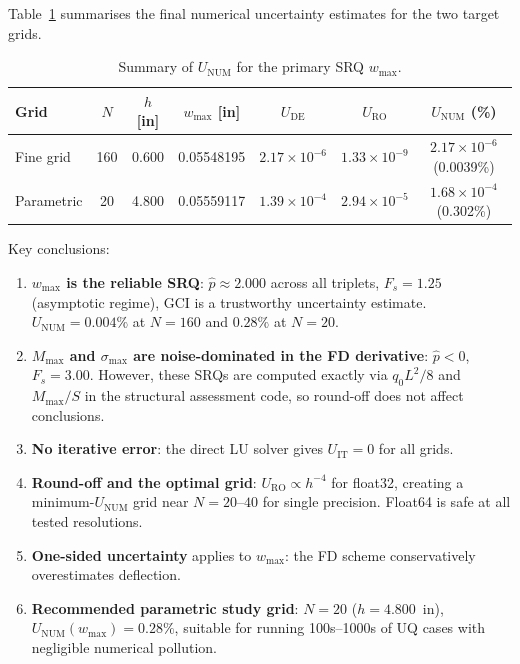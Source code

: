 \documentclass[11pt,letterpaper]{article}
\newcommand{\UDE}{U_{\mathrm{DE}}}
\newcommand{\UIT}{U_{\mathrm{IT}}}
\newcommand{\URO}{U_{\mathrm{RO}}}
\newcommand{\UNUM}{U_{\mathrm{NUM}}}
\newcommand{\pobs}{\hat{p}}
\begin{document}
Table~\ref{tab:summary} summarises the final numerical uncertainty estimates
for the two target grids.

\begin{table}[h!]
\centering
\caption{Summary of $\UNUM$ for the primary SRQ $w_{\max}$.}
\label{tab:summary}
\begin{tabular}{lcccccc}
  \toprule
  Grid & $N$ & $h$ [in] & $w_{\max}$ [in] & $\UDE$ & $\URO$ & $\UNUM$ (\%) \\
  \midrule
  Fine grid      & 160 & 0.600 & 0.05548195 & $2.17\times10^{-6}$ & $1.33\times10^{-9}$ & $2.17\times10^{-6}$ (0.0039\%) \\
  Parametric     &  20 & 4.800 & 0.05559117 & $1.39\times10^{-4}$ & $2.94\times10^{-5}$ & $1.68\times10^{-4}$ (0.302\%) \\
  \bottomrule
\end{tabular}
\end{table}

Key conclusions:
\begin{enumerate}
  \item \textbf{$w_{\max}$ is the reliable SRQ}: $\pobs\approx2.000$ across all
    triplets, $F_s=1.25$ (asymptotic regime), GCI is a trustworthy uncertainty
    estimate.  $\UNUM=0.004\%$ at $N=160$ and $0.28\%$ at $N=20$.

  \item \textbf{$M_{\max}$ and $\sigma_{\max}$ are noise-dominated in the FD
    derivative}: $\pobs<0$, $F_s=3.00$.  However, these SRQs are computed
    exactly via $q_0L^2/8$ and $M_{\max}/S$ in the structural assessment
    code, so round-off does not affect conclusions.

  \item \textbf{No iterative error}: the direct LU solver gives $\UIT=0$ for
    all grids.

  \item \textbf{Round-off and the optimal grid}: $\URO\propto h^{-4}$ for
    float32, creating a minimum-$\UNUM$ grid near $N=20$--$40$ for single
    precision.  Float64 is safe at all tested resolutions.

  \item \textbf{One-sided uncertainty} applies to $w_{\max}$: the FD scheme
    conservatively overestimates deflection.

  \item \textbf{Recommended parametric study grid}: $N=20$ ($h=4.800$~in),
    $\UNUM(w_{\max})=0.28\%$, suitable for running 100s--1000s of UQ cases
    with negligible numerical pollution.
\end{enumerate}
\end{document}
